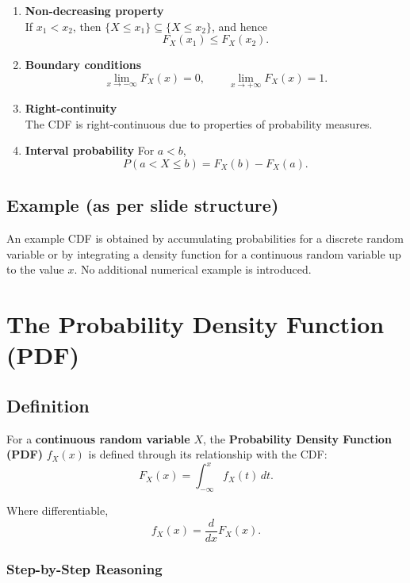 \documentclass[12pt]{article}
\begin{document}
\begin{enumerate}
    \item \textbf{Non-decreasing property}\\
    If $x_1 < x_2$, then $\{X \le x_1\} \subseteq \{X \le x_2\}$, and hence
    \[
    F_X(x_1) \le F_X(x_2).
    \]

    \item \textbf{Boundary conditions}
    \[
    \lim_{x \to -\infty} F_X(x) = 0, \qquad
    \lim_{x \to +\infty} F_X(x) = 1.
    \]

    \item \textbf{Right-continuity}\\
    The CDF is right-continuous due to properties of probability measures.

    \item \textbf{Interval probability}
    For $a < b$,
    \[
    P(a < X \le b) = F_X(b) - F_X(a).
    \]
\end{enumerate}

\subsection{Example (as per slide structure)}

An example CDF is obtained by accumulating probabilities for a discrete random variable or by integrating a density function for a continuous random variable up to the value $x$. No additional numerical example is introduced.

\section{The Probability Density Function (PDF)}

\subsection{Definition}

For a \textbf{continuous random variable} $X$, the \textbf{Probability Density Function (PDF)} $f_X(x)$ is defined through its relationship with the CDF:
\[
F_X(x) = \int_{-\infty}^{x} f_X(t)\, dt.
\]

Where differentiable,
\[
f_X(x) = \frac{d}{dx} F_X(x).
\]

\subsubsection*{Step-by-Step Reasoning}
\end{document}
